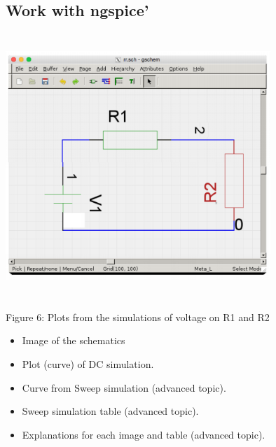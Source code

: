 \documentclass{report}
\begin{document}

 
\subsection{Work with ngspice’}
 

 \begin{center}
\includegraphics[width=10cm,height=10cm,keepaspectratio]{one}

Figure 6: Plots from the simulations
of voltage on R1 and R2
\end{center}
\begin{itemize}
\item Image of the schematics
\item Plot (curve) of DC simulation.
\item Curve from Sweep simulation (advanced topic).
\item Sweep simulation table (advanced topic).
\item Explanations for each image and table (advanced topic).
\end{itemize}
\end{document}
